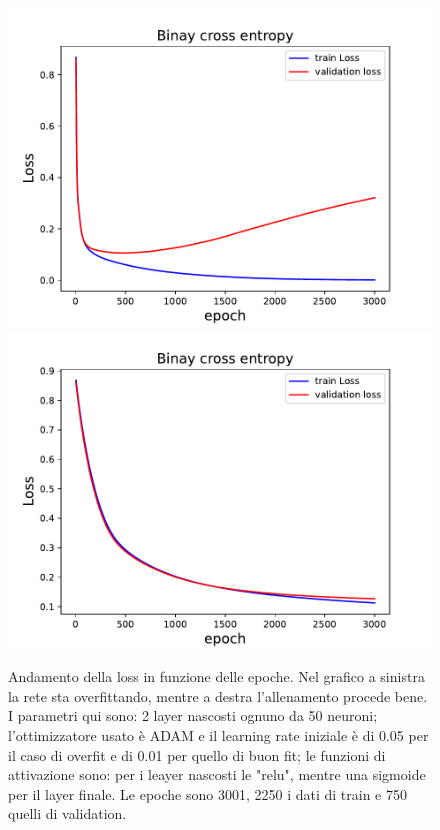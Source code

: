 \documentclass[10pt,a4paper]{article}
\begin{document}
\begin{figure}[h]
\centering
\includegraphics[scale=0.5]{img/Loss_over.pdf}
\includegraphics[scale=0.5]{img/Loss_fit.pdf}
\caption{Andamento della loss in funzione delle epoche. Nel grafico a sinistra la rete sta overfittando, mentre a destra l'allenamento procede bene. I parametri qui sono: 2 layer nascosti ognuno da 50 neuroni; l'ottimizzatore usato è ADAM e il learning rate iniziale è di 0.05 per il caso di overfit e di 0.01 per quello di buon fit; le funzioni di attivazione sono: per i leayer nascosti le "relu", mentre una sigmoide per il layer finale. Le epoche sono 3001, 2250 i dati di train e 750 quelli di validation.}
\end{figure}
\FloatBarrier
\end{document}
